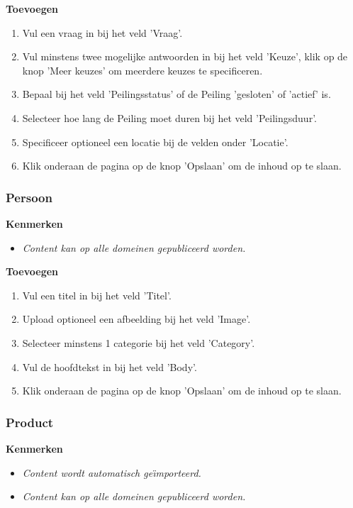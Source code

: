 \textbf{Toevoegen}

\begin{enumerate}
\item Vul een vraag in bij het veld 'Vraag'.
\item Vul minstens twee mogelijke antwoorden in bij het veld 'Keuze', klik op de knop 'Meer keuzes' om meerdere keuzes te specificeren.
\item Bepaal bij het veld 'Peilingsstatus' of de Peiling 'gesloten' of 'actief' is.
\item Selecteer hoe lang de Peiling moet duren bij het veld 'Peilingsduur'.
\item Specificeer optioneel een locatie bij de velden onder 'Locatie'.
\item Klik onderaan de pagina op de knop 'Opslaan' om de inhoud op te slaan.
\end{enumerate}

\subsubsection{Persoon}\label{persoon}

\textbf{Kenmerken}

\begin{itemize}
\item \emph{Content kan op alle domeinen gepubliceerd worden.}
\end{itemize}

\textbf{Toevoegen}

\begin{enumerate}
\item Vul een titel in bij het veld 'Titel'.
\item Upload optioneel een afbeelding bij het veld 'Image'.
\item Selecteer minstens 1 categorie bij het veld 'Category'.
\item Vul de hoofdtekst in bij het veld 'Body'.
\item Klik onderaan de pagina op de knop 'Opslaan' om de inhoud op te slaan.
\end{enumerate}

\subsubsection{Product}\label{product}

\textbf{Kenmerken}

\begin{itemize}
\item \emph{Content wordt automatisch ge{\"\i}mporteerd.}
\item \emph{Content kan op alle domeinen gepubliceerd worden.}
\end{itemize}

